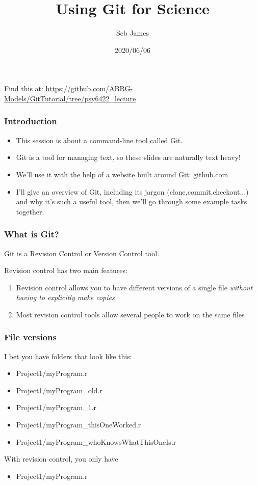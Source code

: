 \documentclass{beamer}
\title{Using Git for Science}
\author{Seb James}
\institute{PSY6422}
\date{2020/06/06}
\begin{document}
\begin{frame}
  \titlepage %
  Find this at: \url{https://github.com/ABRG-Models/GitTutorial/tree/psy6422_lecture}
\end{frame}

\begin{frame}
  \frametitle{Introduction}
  \begin{itemize}
    \item This session is about a command-line tool called Git.

    \item Git is a tool for managing text, so these slides are naturally text
      heavy!

    \item We'll use it with the help of a website built around Git: github.com

    \item I'll give an overview of Git, including its jargon
      (\alert{clone},\alert{commit},\alert{checkout}...) and why it's
      such a useful tool, then we'll go through some example tasks together.
  \end{itemize}
\end{frame}

\begin{frame}
  \frametitle{What is Git?}
  Git is a \alert{Revision Control} or \alert{Version Control} tool.

  Revision control has two main features:

  \begin{enumerate}
    \pause \item Revision control allows you to have different versions of a
      single file \emph{without having to explicitly make copies}
      \pause \item Most revision control tools allow several people to work
      on the same files %
  \end{enumerate}
\end{frame}

\begin{frame}
  \frametitle{File versions}
  I bet you have folders that look like this:
  \pause \begin{itemize}
  \item Project1/myProgram.r
    \pause \item Project1/myProgram\_old.r
  \item Project1/myProgram\_1.r
  \item Project1/myProgram\_thisOneWorked.r
  \item Project1/myProgram\_whoKnowsWhatThisOneIs.r
  \end{itemize}
  \pause With revision control, you only have
  \begin{itemize}
  \item Project1/myProgram.r
  \end{itemize}
\end{frame}
\end{document}
